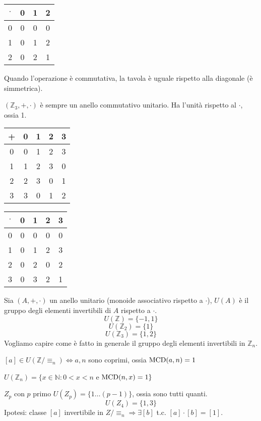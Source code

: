 \begin{tabular}{c|ccc}
$\cdot$ & 0 & 1 & 2 \\
\hline
0 & 0 & 0 & 0 \\
1 & 0 & 1 & 2 \\
2 & 0 & 2 & 1
\end{tabular}

Quando l'operazione \`e commutativa, la tavola \`e uguale rispetto alla diagonale (\`e simmetrica).

$(\mathbb{Z}_3, +, \cdot)$ \`e sempre un anello commutativo unitario. Ha l'unit\`a rispetto al $\cdot$, ossia 1.

\begin{tabular}{c|cccc}
+ & 0 & 1 & 2 & 3 \\
\hline
0 & 0 & 1 & 2 & 3 \\
1 & 1 & 2 & 3 & 0 \\
2 & 2 & 3 & 0 & 1 \\
3 & 3 & 0 & 1 & 2
\end{tabular}

\begin{tabular}{c|cccc}
$\cdot$ & 0 & 1 & 2 & 3 \\
\hline
0 & 0 & 0 & 0 & 0 \\
1 & 0 & 1 & 2 & 3 \\
2 & 0 & 2 & 0 & 2 \\
3 & 0 & 3 & 2 & 1
\end{tabular}

Sia $(A, +, \cdot)$ un anello unitario (monoide associativo rispetto a $\cdot$), $U(A)$ \`e il gruppo degli elementi invertibili di $A$ rispetto a $\cdot$.
\[
U(\mathbb{Z}) = \{ -1, 1 \}
\]
\[
U(\mathbb{Z}_2) = \{ 1 \}
\]
\[
U(\mathbb{Z}_3) = \{ 1,  2 \}
\]
Vogliamo capire come \`e fatto in generale il gruppo degli elementi invertibili in $\mathbb{Z}_n$.

\begin{prop}
$[a] \in U(\mathbb{Z} / \equiv_n) \Leftrightarrow a, n$ sono coprimi, ossia $\operatorname{MCD}(a, n) = 1$
\end{prop}

\begin{cor}
$U(\mathbb{Z}_n) = \{ x \in \mathbb{N} : 0 < x < n$ e $\operatorname{MCD}(n, x) = 1\}$
\end{cor}

$Z_p$ con $p$ primo $U(Z_p) = \{ 1 \dots (p-1)\}$, ossia sono tutti quanti.
\[
U(Z_4) = \{1, 3\}
\]
Ipotesi: classe $[a]$ invertibile in $Z / \equiv_n \Rightarrow \exists [b]$ t.c. $[a] \cdot [b] = [1]$. 

